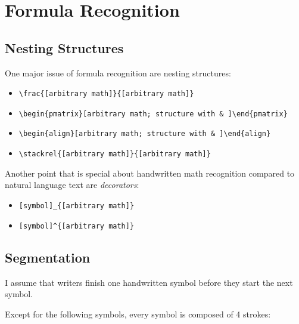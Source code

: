 \chapter{Formula Recognition}\label{ch:FormulaRecognition}
\section{Nesting Structures}
One major issue of formula recognition are nesting structures:

\begin{itemize}
    \item \verb+\frac{[arbitrary math]}{[arbitrary math]}+
    \item \verb+\begin{pmatrix}[arbitrary math; structure with & ]\end{pmatrix}+
    \item \verb+\begin{align}[arbitrary math; structure with & ]\end{align}+
    \item \verb+\stackrel{[arbitrary math]}{[arbitrary math]}+
\end{itemize}

Another point that is special about handwritten math recognition compared to
natural language text are \textit{decorators}:

\begin{itemize}
    \item \verb+[symbol]_{[arbitrary math]}+
    \item \verb+[symbol]^{[arbitrary math]}+
\end{itemize}

\section{Segmentation}
I assume that writers finish one handwritten symbol before they start the next
symbol.

Except for the following symbols, every symbol is composed of 4 strokes:

